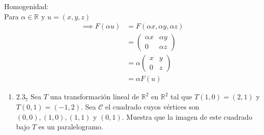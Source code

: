 \documentclass{article}
\begin{document}
\begin{enumerate}
			Homogenidad:\\
			Para \(\alpha \in \mathbb{R}\) y \(u=(x,y,z)\)
			\begin{equation*}
				\begin{aligned}
					\implies F(\alpha u) &=F(\alpha x, \alpha y, \alpha z)\\
										 &=\begin{pmatrix}
										 	\alpha x & \alpha y\\
										 	0        & \alpha z
										   \end{pmatrix}\\
										 &=\alpha \begin{pmatrix}
										 	x & y \\
										 	0 & z
										 \end{pmatrix}\\
										 &=\alpha F(u)
				\end{aligned}
			\end{equation*}
			
		\end{enumerate}
		
		\begin{enumerate}
			
			
			\item[] \(2.3_7\) Sea \(T\) una transformación lineal de \(\mathbb{R}^2\) en \(\mathbb{R}^2\) tal que \(T(1,0)=(2,1)\) y \(T(0,1)=(-1,2)\). Sea \(\mathscr{C}\) el cuadrado cuyos vértices son \((0,0),(1,0),(1,1)\) y \((0,1)\). Muestra que la imagen de este cuadrado bajo \(T\) es un paralelogramo.
			
		\end{enumerate}
		
\end{document}
